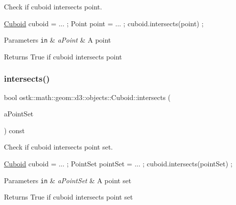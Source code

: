 Check if cuboid intersects point. 


\begin{DoxyCode}
\hyperlink{classostk_1_1math_1_1geom_1_1d3_1_1objects_1_1_cuboid_a1da071d7cbb0a694348628f098f77c5b}{Cuboid} cuboid = ... ;
Point point = ... ;
cuboid.intersects(point) ;
\end{DoxyCode}



\begin{DoxyParams}[1]{Parameters}
\mbox{\tt in}  & {\em a\+Point} & A point \\
\hline
\end{DoxyParams}
\begin{DoxyReturn}{Returns}
True if cuboid intersects point 
\end{DoxyReturn}
\mbox{\label{classostk_1_1math_1_1geom_1_1d3_1_1objects_1_1_cuboid_aa922a6ee7f3fe7cbbbfe584fa0d86e2c}} 
\subsubsection{\texorpdfstring{intersects()}{intersects()}\hspace{0.1cm}{\footnotesize\ttfamily [2/9]}}
{\footnotesize\ttfamily bool ostk\+::math\+::geom\+::d3\+::objects\+::\+Cuboid\+::intersects (\begin{DoxyParamCaption}\item[{const \hyperlink{classostk_1_1math_1_1geom_1_1d3_1_1objects_1_1_point_set}{Point\+Set} \&}]{a\+Point\+Set }\end{DoxyParamCaption}) const}



Check if cuboid intersects point set. 


\begin{DoxyCode}
\hyperlink{classostk_1_1math_1_1geom_1_1d3_1_1objects_1_1_cuboid_a1da071d7cbb0a694348628f098f77c5b}{Cuboid} cuboid = ... ;
PointSet pointSet = ... ;
cuboid.intersects(pointSet) ;
\end{DoxyCode}



\begin{DoxyParams}[1]{Parameters}
\mbox{\tt in}  & {\em a\+Point\+Set} & A point set \\
\hline
\end{DoxyParams}
\begin{DoxyReturn}{Returns}
True if cuboid intersects point set 
\end{DoxyReturn}
\mbox{\label{classostk_1_1math_1_1geom_1_1d3_1_1objects_1_1_cuboid_a4a9e6493bb2339591bceb908e0b561d1}} 

